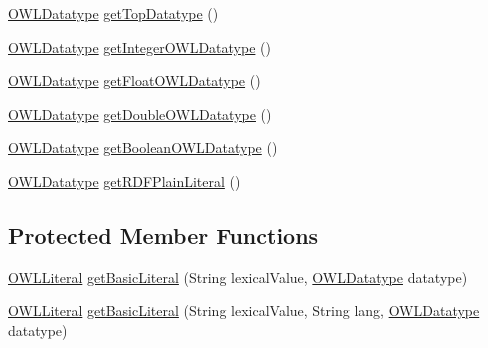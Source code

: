 \begin{DoxyCompactItemize}
\item 
\hyperlink{interfaceorg_1_1semanticweb_1_1owlapi_1_1model_1_1_o_w_l_datatype}{O\-W\-L\-Datatype} \hyperlink{classuk_1_1ac_1_1manchester_1_1cs_1_1owl_1_1owlapi_1_1_internals_no_cache_ac10c719ebe681d07ea34bf71a644d07c}{get\-Top\-Datatype} ()
\item 
\hyperlink{interfaceorg_1_1semanticweb_1_1owlapi_1_1model_1_1_o_w_l_datatype}{O\-W\-L\-Datatype} \hyperlink{classuk_1_1ac_1_1manchester_1_1cs_1_1owl_1_1owlapi_1_1_internals_no_cache_ab8385aeaf06d0118c8a434176632f94a}{get\-Integer\-O\-W\-L\-Datatype} ()
\item 
\hyperlink{interfaceorg_1_1semanticweb_1_1owlapi_1_1model_1_1_o_w_l_datatype}{O\-W\-L\-Datatype} \hyperlink{classuk_1_1ac_1_1manchester_1_1cs_1_1owl_1_1owlapi_1_1_internals_no_cache_a55046403c443b3c770dd621df9e51c2f}{get\-Float\-O\-W\-L\-Datatype} ()
\item 
\hyperlink{interfaceorg_1_1semanticweb_1_1owlapi_1_1model_1_1_o_w_l_datatype}{O\-W\-L\-Datatype} \hyperlink{classuk_1_1ac_1_1manchester_1_1cs_1_1owl_1_1owlapi_1_1_internals_no_cache_a3148b4e7ff80bc8838cce1aaf3698b14}{get\-Double\-O\-W\-L\-Datatype} ()
\item 
\hyperlink{interfaceorg_1_1semanticweb_1_1owlapi_1_1model_1_1_o_w_l_datatype}{O\-W\-L\-Datatype} \hyperlink{classuk_1_1ac_1_1manchester_1_1cs_1_1owl_1_1owlapi_1_1_internals_no_cache_a0c6fe78b1a0e5ad4e524d5d85d63e9f5}{get\-Boolean\-O\-W\-L\-Datatype} ()
\item 
\hyperlink{interfaceorg_1_1semanticweb_1_1owlapi_1_1model_1_1_o_w_l_datatype}{O\-W\-L\-Datatype} \hyperlink{classuk_1_1ac_1_1manchester_1_1cs_1_1owl_1_1owlapi_1_1_internals_no_cache_ab0a859141930a21713820c1e5d13956b}{get\-R\-D\-F\-Plain\-Literal} ()
\end{DoxyCompactItemize}
\subsection*{Protected Member Functions}
\begin{DoxyCompactItemize}
\item 
\hyperlink{interfaceorg_1_1semanticweb_1_1owlapi_1_1model_1_1_o_w_l_literal}{O\-W\-L\-Literal} \hyperlink{classuk_1_1ac_1_1manchester_1_1cs_1_1owl_1_1owlapi_1_1_internals_no_cache_af657c7b77f2b7493ada8570336c2d708}{get\-Basic\-Literal} (String lexical\-Value, \hyperlink{interfaceorg_1_1semanticweb_1_1owlapi_1_1model_1_1_o_w_l_datatype}{O\-W\-L\-Datatype} datatype)
\item 
\hyperlink{interfaceorg_1_1semanticweb_1_1owlapi_1_1model_1_1_o_w_l_literal}{O\-W\-L\-Literal} \hyperlink{classuk_1_1ac_1_1manchester_1_1cs_1_1owl_1_1owlapi_1_1_internals_no_cache_a253bfc1d60603ffc240664a877d3bbda}{get\-Basic\-Literal} (String lexical\-Value, String lang, \hyperlink{interfaceorg_1_1semanticweb_1_1owlapi_1_1model_1_1_o_w_l_datatype}{O\-W\-L\-Datatype} datatype)
\end{DoxyCompactItemize}
